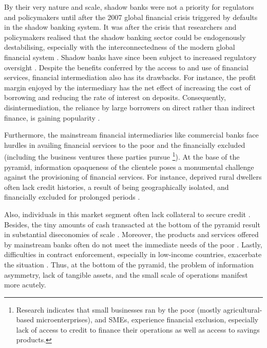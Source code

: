 \documentclass[a4paper,nobind]{templates/ociamthesis}
\begin{document}
By their very nature and scale, shadow banks were not a priority for regulators and policymakers until after the 2007 global financial crisis triggered by defaults in the shadow banking system. It was after the crisis that researchers and policymakers realised that the shadow banking sector could be endogenously destabilising, especially with the interconnectedness of the modern global financial system \autocite{board2017assessment}. Shadow banks have since been subject to increased regulatory oversight \autocite{fenton2017role}. Despite the benefits conferred by the access to and use of financial services, financial intermediation also has its drawbacks. For instance, the profit margin enjoyed by the intermediary has the net effect of increasing the cost of borrowing and reducing the rate of interest on deposits. Consequently, disintermediation, the reliance by large borrowers on direct rather than indirect finance, is gaining popularity \autocite{greenbaum2019contemporary}.

Furthermore, the mainstream financial intermediaries like commercial banks face hurdles in availing financial services to the poor and the financially excluded (including the business ventures these parties pursue \footnote{Research indicates that small businesses ran by the poor (mostly agricultural-based microenterprises), and SMEs, experience financial exclusion, especially lack of access to credit to finance their operations as well as access to savings products.}). At the base of the pyramid, information opaqueness of the clientele poses a monumental challenge against the provisioning of financial services. For instance, deprived rural dwellers often lack credit histories, a result of being geographically isolated, and financially excluded for prolonged periods \autocite{alimukhamedova2017importance}.

Also, individuals in this market segment often lack collateral to secure credit \autocite{briere2015does}. Besides, the tiny amounts of cash transacted at the bottom of the pyramid result in substantial diseconomies of scale \autocite{abate2014cost,cobb2016funding}. Moreover, the products and services offered by mainstream banks often do not meet the immediate needs of the poor \autocite{gajjala2016financial}. Lastly, difficulties in contract enforcement, especially in low-income countries, exacerbate the situation \autocite{klapper2015role}. Thus, at the bottom of the pyramid, the problem of information asymmetry, lack of tangible assets, and the small scale of operations manifest more acutely.
\end{document}
